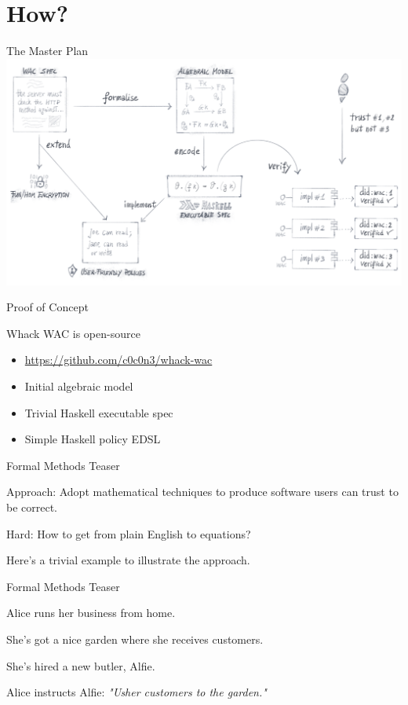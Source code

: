 \section{How?}


\begin{frame}{The Master Plan}
  \includegraphics[height=0.65\paperheight]{./media/implementation-plan.png}
\end{frame}


\begin{frame}{Proof of Concept}

Whack WAC is open-source
\begin{itemize}
  \item \href{https://github.com/c0c0n3/whack-wac}{https://github.com/c0c0n3/whack-wac}
  \item Initial algebraic model
  \item Trivial Haskell executable spec
  \item Simple Haskell policy EDSL
\end{itemize}

\end{frame}


\begin{frame}{Formal Methods Teaser}

Approach: Adopt mathematical techniques to produce software users
can trust to be correct.

\bigskip

Hard: How to get from plain English to equations?

\bigskip

Here's a trivial example to illustrate the approach.

\end{frame}


\begin{frame}{Formal Methods Teaser}

Alice runs her business from home.

She's got a nice garden where she receives customers.

She's hired a new butler, Alfie.

Alice instructs Alfie: \emph{"Usher customers to the garden."}

\end{frame}


